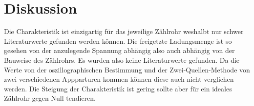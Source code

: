 \section{Diskussion}
\label{sec:Diskussion}
Die Charakteristik ist einzigartig für das jeweilige Zählrohr weshalbt nur
schwer Literaturwerte gefunden werden können.
Die freigetzte Ladungsmenge ist so gesehen von der anzulegende Spannung
abhängig also auch abhängig von der Bauweise des Zählrohrs. Es wurden also
keine Literaturwerte gefunden. Da die Werte von der oszillographischen
Bestimmung und der Zwei-Quellen-Methode von zwei verschiedenen Appparturen
kommen können diese auch nicht verglichen werden. Die Steigung der Charakteristik
ist gering sollte aber für ein ideales Zählrohr gegen Null tendieren.


%
